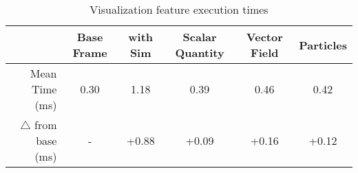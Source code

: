 \begin{table}[]
    \centering
    \begin{tabular}{|r|S[table-format=1.2,retain-explicit-plus]|S[table-format=1.2,retain-explicit-plus]|S[table-format=1.2,retain-explicit-plus]|S[table-format=1.2,retain-explicit-plus]|S[table-format=1.2,retain-explicit-plus]|}
    \hline
        & {Base Frame} & {with Sim} & {Scalar Quantity} & {Vector Field} & {Particles} \\ 
    \hline
        Mean Time (\si{\milli\second}) & 0.30 & 1.18 & 0.39 & 0.46 & 0.42 \\
        $\triangle$ from base (\si{\milli\second}) & {-} & +0.88 & +0.09 & +0.16 & +0.12 \\ 
    \hline
    \end{tabular}
    \caption{Visualization feature execution times}
    \label{tab:results:viz:speed}
\end{table}